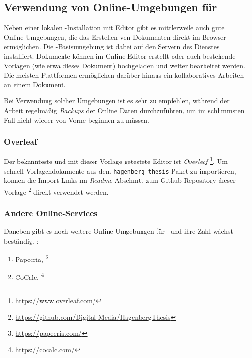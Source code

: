\subsection{Verwendung von Online-Umgebungen für \latex}

Neben einer lokalen \latex-Installation mit Editor gibt es mittlerweile auch
gute Online-Umgebungen, die das Erstellen von\latex-Dokumenten direkt im Browser
ermöglichen. Die \latex-Basisumgebung ist dabei auf den Servern des Dienstes
installiert. Dokumente können im Online-Editor erstellt oder auch bestehende
Vorlagen (wie etwa dieses Dokument) hochgeladen und weiter bearbeitet werden.
Die meisten Plattformen ermöglichen darüber hinaus ein kollaboratives
Arbeiten an einem Dokument.

Bei Verwendung solcher Umgebungen ist es sehr zu empfehlen, während
der Arbeit regelmäßig \emph{Backups} der Online Daten durchzuführen, um 
im schlimmsten Fall nicht wieder von Vorne beginnen zu müssen.

\subsubsection{Overleaf}

Der bekannteste und mit dieser Vorlage getestete Editor ist \emph{Overleaf}%
\footnote{\url{https://www.overleaf.com/}}.
Um schnell Vorlagendokumente aus dem \texttt{hagenberg-thesis} Paket zu
importieren, können die Im\-port-Links im \emph{Readme}-Abschnitt zum
Github-Repository dieser Vorlage%
\footnote{\url{https://github.com/Digital-Media/HagenbergThesis}}
direkt verwendet werden.

\subsubsection{Andere Online-Services}

Daneben gibt es noch weitere Online-Umgebungen für \latex\ und ihre Zahl wächst
beständig, \zB:
%
\begin{enumerate}
	\item Papeeria,%
	\footnote{\url{https://papeeria.com/}}
	\item CoCalc.%
	\footnote{\url{https://cocalc.com/}}
\end{enumerate}
